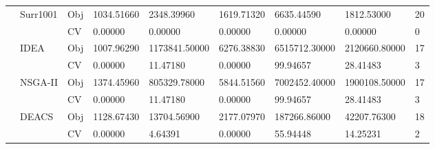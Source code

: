 \begin{table*}[!htb]
\begin{tabular}{lllllllll}
		& \multirow{2}{*}{Surr1001}          & Obj                                & 1034.51660                         & 2348.39960                         & 1619.71320                           & 6635.44590                          & 1812.53000                        & 20               \\
		&                                    & CV                                 & 0.00000                            & 0.00000                            & 0.00000                              & 0.00000                             & 0.00000                           & 0                \\
		& \multirow{2}{*}{IDEA}              & Obj                                & 1007.96290                         & 1173841.50000                      & 6276.38830                           & 6515712.30000                       & 2120660.80000                     & 17               \\
		&                                    & CV                                 & 0.00000                            & 11.47180                           & 0.00000                              & 99.94657                            & 28.41483                          & 3                \\
		& \multirow{2}{*}{NSGA-II}           & Obj                                & 1374.45960                         & 805329.78000                       & 5844.51560                           & 7002452.40000                       & 1900108.50000                     & 17               \\
		&                                    & CV                                 & 0.00000                            & 11.47180                           & 0.00000                              & 99.94657                            & 28.41483                          & 3                \\
		& \multirow{2}{*}{DEACS}             & Obj                                & 1128.67430                         & 13704.56900                        & 2177.07970                           & 187266.86000                        & 42207.76300                       & 18               \\
		&                                    & CV                                 & 0.00000                            & 4.64391                            & 0.00000                              & 55.94448                            & 14.25231                          & 2                \\

\end{tabular}
\end{table*}
